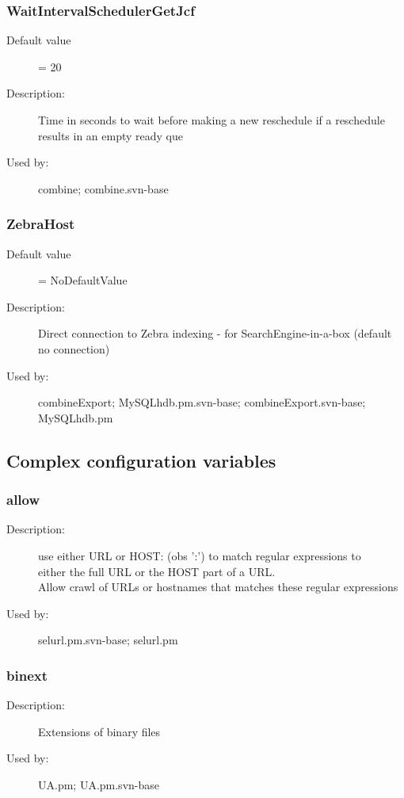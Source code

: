 \subsubsection{WaitIntervalSchedulerGetJcf}
\label{WaitIntervalSchedulerGetJcf}
\begin{description}
\item[Default value] = 20
\item[Description:] Time in seconds to wait before making a new reschedule if a reschedule results in an empty ready que
\item[Used by:] combine; combine.svn-base
\end{description}
\subsubsection{ZebraHost}
\label{ZebraHost}
\begin{description}
\item[Default value] = NoDefaultValue
\item[Description:] Direct connection to Zebra indexing - for SearchEngine-in-a-box (default no connection)
\item[Used by:] combineExport; MySQLhdb.pm.svn-base; combineExport.svn-base; MySQLhdb.pm
\end{description}
\subsection{Complex configuration variables}
\subsubsection{allow}
\label{allow}
\begin{description}
\item[Description:] use either URL or HOST: (obs ':') to match regular expressions to \\  either the full URL or the HOST part of a URL. \\ Allow crawl of URLs or hostnames that matches these regular expressions
\item[Used by:] selurl.pm.svn-base; selurl.pm
\end{description}
\subsubsection{binext}
\label{binext}
\begin{description}
\item[Description:] Extensions of binary files
\item[Used by:] UA.pm; UA.pm.svn-base
\end{description}
